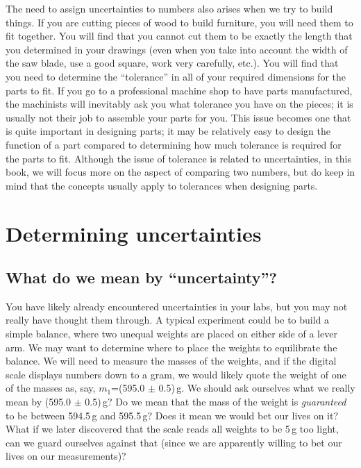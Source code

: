 The need to assign uncertainties to numbers also arises when we try to build things. If you are cutting pieces of wood to build furniture, you will need them to fit together. You will find that you cannot cut them to be exactly the length that you determined in your drawings (even when you take into account the width of the saw blade, use a good square, work very carefully, etc.). You will find that you need to determine the ``tolerance'' in all of your required dimensions for the parts to fit. If you go to a professional machine shop to have parts manufactured, the machinists will inevitably ask you what tolerance you have on the pieces; it is usually not their job to assemble your parts for you. This issue becomes one that is quite important in designing parts; it may be relatively easy to design the function of a part compared to determining how much tolerance is required for the parts to fit. Although the issue of tolerance is related to uncertainties, in this book, we will focus more on the aspect of comparing two numbers, but do keep in mind that the concepts usually apply to tolerances when designing parts.

\section{Determining uncertainties}
\subsection{What do we mean by ``uncertainty''?}
You have likely already encountered uncertainties in your labs, but you may not really have thought them through. A typical experiment could be to build a simple balance, where two unequal weights are placed on either side of a lever arm. We may want to determine where to place the weights to equilibrate the balance. We will need to measure the masses of the weights, and if the digital scale displays numbers down to a gram, we would likely quote the weight of one of the masses as, say,  $m_1$=(595.0 $\pm$ 0.5)\,g. We should ask ourselves what we really mean by (595.0 $\pm$ 0.5)\,g? Do we mean that the mass of the weight is \textit{guaranteed} to be between 594.5\,g and 595.5\,g? Does it mean we would bet our lives on it? What if we later discovered that the scale reads all weights to be 5\,g too light, can we guard ourselves against that (since we are apparently willing to bet our lives on our measurements)?


